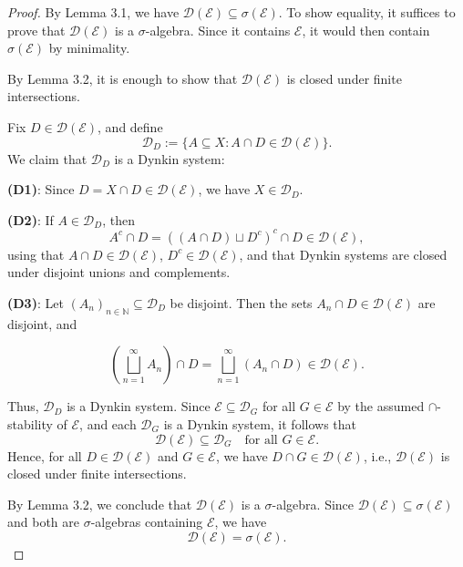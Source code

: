 \documentclass[12pt]{article}
\theoremstyle{definition}
\begin{document}
\begin{proof}
By Lemma 3.1, we have \( \mathcal{D}(\mathcal{E}) \subseteq \sigma(\mathcal{E}) \). To show equality, it suffices to prove that \( \mathcal{D}(\mathcal{E}) \) is a \( \sigma \)-algebra. Since it contains \( \mathcal{E} \), it would then contain \( \sigma(\mathcal{E}) \) by minimality.

By Lemma 3.2, it is enough to show that \( \mathcal{D}(\mathcal{E}) \) is closed under finite intersections.

Fix \( D \in \mathcal{D}(\mathcal{E}) \), and define
\[
\mathcal{D}_D := \{ A \subseteq X : A \cap D \in \mathcal{D}(\mathcal{E}) \}.
\]
We claim that \( \mathcal{D}_D \) is a Dynkin system:

\textbf{(D1)}: Since \( D = X \cap D \in \mathcal{D}(\mathcal{E}) \), we have \( X \in \mathcal{D}_D \).

\medskip
\textbf{(D2)}: If \( A \in \mathcal{D}_D \), then
\[
A^c \cap D = \left( (A \cap D) \sqcup D^c \right)^c \cap D \in \mathcal{D}(\mathcal{E}),
\]
using that \( A \cap D \in \mathcal{D}(\mathcal{E}) \), \( D^c \in \mathcal{D}(\mathcal{E}) \), and that Dynkin systems are closed under disjoint unions and complements.

\medskip
\textbf{(D3)}: Let \( (A_n)_{n \in \mathbb{N}} \subseteq \mathcal{D}_D \) be disjoint. Then the sets \( A_n \cap D \in \mathcal{D}(\mathcal{E}) \) are disjoint, and

\[
\left( \bigsqcup_{n=1}^\infty A_n \right) \cap D = \bigsqcup_{n=1}^\infty (A_n \cap D) \in \mathcal{D}(\mathcal{E}).
\]

Thus, \( \mathcal{D}_D \) is a Dynkin system. Since \( \mathcal{E} \subseteq \mathcal{D}_G \) for all \( G \in \mathcal{E} \) by the assumed \( \cap \)-stability of \( \mathcal{E} \), and each \( \mathcal{D}_G \) is a Dynkin system, it follows that
\[
\mathcal{D}(\mathcal{E}) \subseteq \mathcal{D}_G \quad \text{for all } G \in \mathcal{E}.
\]
Hence, for all \( D \in \mathcal{D}(\mathcal{E}) \) and \( G \in \mathcal{E} \), we have \( D \cap G \in \mathcal{D}(\mathcal{E}) \), i.e., \( \mathcal{D}(\mathcal{E}) \) is closed under finite intersections.

By Lemma 3.2, we conclude that \( \mathcal{D}(\mathcal{E}) \) is a \( \sigma \)-algebra. Since \( \mathcal{D}(\mathcal{E}) \subseteq \sigma(\mathcal{E}) \) and both are \( \sigma \)-algebras containing \( \mathcal{E} \), we have
\[
\mathcal{D}(\mathcal{E}) = \sigma(\mathcal{E}).
\]
\end{proof}
\end{document}
